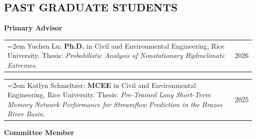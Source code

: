 \documentclass[10pt,oneside]{article}
\makeatletter
\newenvironment{alignedentrieshang}[1][2em]{%
  \noindent%
}{%
}
\newcommand{\hangingitem}[2]{%
  \noindent%
  \begin{tabular*}{\textwidth}{@{}p{0.85\textwidth}@{\extracolsep{\fill}}r@{}}%
    \hangindent=2em \hangafter=1 #1 & #2%
  \end{tabular*}%
}
\newcommand{\grouplabel}[1]{%
  \par\addvspace{0.6em}%
  \noindent\textbf{#1}%
  \par\addvspace{0.2em}%
}
\makeatother
\begin{document}
\subsection{PAST GRADUATE STUDENTS}

\grouplabel{Primary Advisor}

\begin{alignedentrieshang}

\hangingitem{Yuchen Lu: \textbf{Ph.D.} in Civil and Environmental Engineering, Rice University. Thesis: \textit{Probabilistic Analysis of Nonstationary Hydroclimate Extremes}.}{2026}

\hangingitem{Katlyn Schmeltzer: \textbf{MCEE} in Civil and Environmental Engineering, Rice University. Thesis: \textit{Pre-Trained Long Short-Term Memory Network Performance for Streamflow Prediction in the Brazos River Basin}.}{2025}

\end{alignedentrieshang}

\grouplabel{Committee Member}
\end{document}
